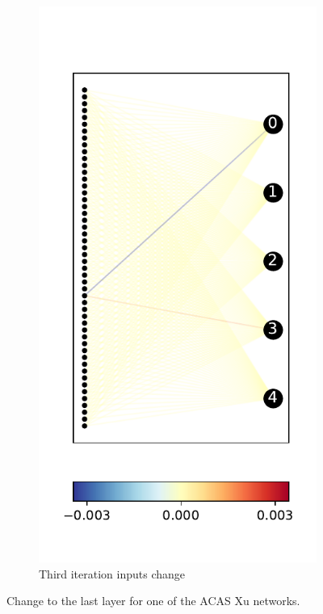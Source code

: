 \documentclass{easychair}
\begin{document}
\begin{figure}
\begin{subfigure}{0.2\linewidth}
  \includegraphics[width=\linewidth]{./images/ACASXU_2_9_all1_vals.pdf}
  \caption{Third iteration inputs change}
\end{subfigure}
\caption{Change to the last layer for one of the ACAS Xu networks.}
\label{fig:lastLayerACASXU}
\end{figure}
\end{document}

